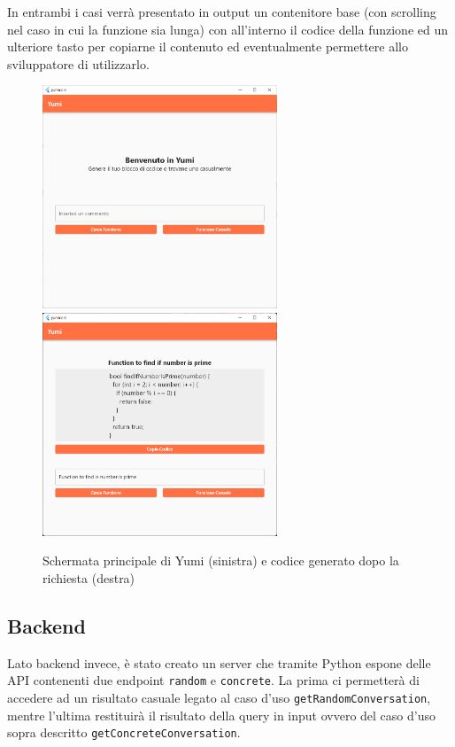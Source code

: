 In entrambi i casi verrà presentato in output un contenitore base (con scrolling nel caso in cui la funzione sia lunga) con all'interno il codice della funzione ed un ulteriore tasto per copiarne il contenuto ed eventualmente permettere allo sviluppatore di utilizzarlo.

\begin{figure}[h]%
    \centering
    {{\includegraphics[width=7cm]{immagini/yumi_interface.png} }}%
    \qquad
    {{\includegraphics[width=7cm]{immagini/yumi_query.png} }}%
    \caption{Schermata principale di Yumi (sinistra) e codice generato dopo la richiesta (destra)}%
    \label{fig:example}%
\end{figure}

\subsection{Backend}
Lato backend invece, è stato creato un server che tramite Python espone delle API contenenti due endpoint \texttt{random} e \texttt{concrete}. La prima ci permetterà di accedere ad un risultato casuale legato al caso d'uso \texttt{getRandomConversation}, mentre l'ultima restituirà il risultato della query in input ovvero del caso d'uso sopra descritto \texttt{getConcreteConversation}.

